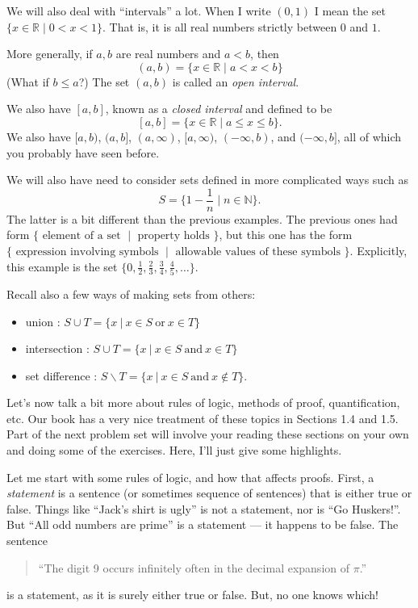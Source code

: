 \documentclass[12pt]{amsart}
\def\ssm{\smallsetminus}
\newcommand{\R}{{\mathbb{R}}}
\newcommand{\N}{\mathbb{N}}
\numberwithin{equation}{section}
\theoremstyle{plain} %
\theoremstyle{definition}
\theoremstyle{remark}
\begin{document}
We will also deal with ``intervals'' a lot. 
When I write $(0,1)$ I mean the set $\{x \in \R \mid 0 < x < 1\}$.  That is, it is all real numbers strictly between $0$ and $1$.

More generally, if $a, b$ are real numbers and $a < b$, then 
$$
(a,b) = \{x \in \R \mid a < x < b \}
$$
(What if $b \leq a$?) The set $(a,b)$ is called an {\em open interval}.

We also have $[a,b]$, known as a {\em closed interval} and defined to be
$$
[a,b] = \{x \in \R \mid a \leq x \leq b\}.
$$
We also have $[a,b)$, $(a,b]$, $(a, \infty)$, $[a, \infty)$, $(-\infty, b)$, and $(-\infty, b]$, all of which you probably have seen before.  



We will also have need to consider sets defined in more complicated ways such as
$$
S = \{1 - \frac{1}{n} \mid n \in \N\}.
$$
The latter is a bit different than the previous examples. The previous ones had form $\{ \text{ element of a set } \mid \text{ property holds } \}$, but this one has
the form $\{ \text{ expression involving symbols } \mid \text{ allowable values of these symbols }\}$. Explicitly, this example is the set
$\{0, \frac12, \frac23, \frac34, \frac45, \dots \}$.

Recall also a few ways of making sets from others: 
\begin{itemize}
	\item union : $S\cup T=\{ x \ | \ x\in S \ \text{or} \ x\in T\}$
	\item intersection : $S\cup T=\{ x \ | \ x\in S \ \text{and} \ x\in T\}$
	\item set difference : $S\ssm T = \{ x \ | \ x\in S \ \text{and} \ x\notin T\}$.
\end{itemize}



Let's now talk a bit more about rules of logic, methods of proof, quantification, etc. Our book has a very nice treatment of these topics in Sections 1.4 and 1.5. Part of the next problem set will involve your reading these sections on your own
and doing some of the exercises. Here, I'll just give some highlights.

Let me start with some rules of logic, and how that affects proofs. First, a {\em statement} is a sentence (or sometimes sequence of sentences) that is either
true or false. Things like ``Jack's shirt is ugly'' is not a statement, nor is ``Go Huskers!''. But ``All odd numbers are prime'' is a statement --- it happens
to be false.  The sentence 
\begin{quote}
	``The digit 9 occurs infinitely often in the decimal expansion of $\pi$.''
\end{quote}
is a statement, as it is surely either true or false. But, no one knows which!
\end{document}
